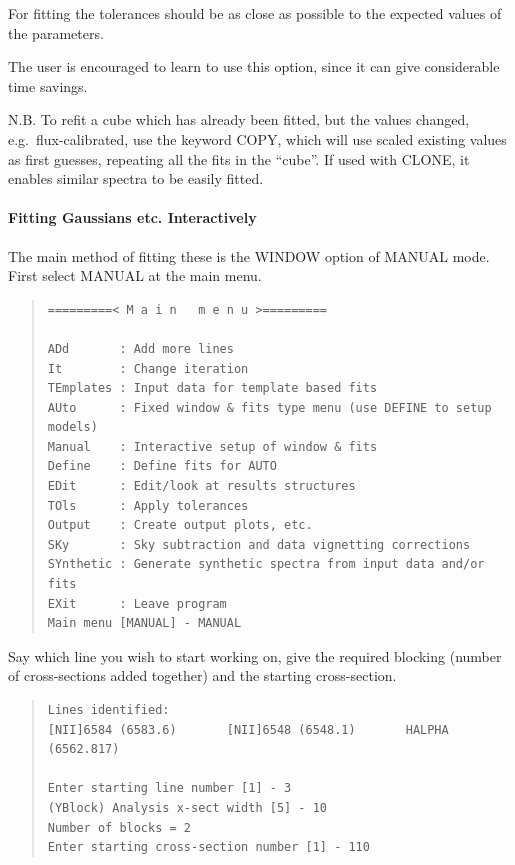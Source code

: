 For fitting the tolerances should be as close as possible to the
expected values of the parameters.

The user is encouraged to learn to use this option, since
it can give considerable time savings.

N.B. To refit a cube which has already been fitted, but the values
changed, e.g.\ flux-calibrated, use the keyword COPY, which will use
scaled existing values as first guesses, repeating all the fits in the
``cube''.
If used with CLONE, it enables similar spectra to be easily fitted. 


\paragraph{Fitting Gaussians etc. Interactively}

The main method of fitting these is the WINDOW option of MANUAL mode.
First select MANUAL at the main menu.
 
\begin{quote}\begin{verbatim}
=========< M a i n   m e n u >=========
 
ADd       : Add more lines
It        : Change iteration
TEmplates : Input data for template based fits
AUto      : Fixed window & fits type menu (use DEFINE to setup models)
Manual    : Interactive setup of window & fits
Define    : Define fits for AUTO
EDit      : Edit/look at results structures
TOls      : Apply tolerances
Output    : Create output plots, etc.
SKy       : Sky subtraction and data vignetting corrections
SYnthetic : Generate synthetic spectra from input data and/or fits
EXit      : Leave program
Main menu [MANUAL] - MANUAL
\end{verbatim}\end{quote}

Say which line you wish to start working on, give the required blocking
(number of cross-sections added together) and the starting
cross-section.

\begin{quote}\begin{verbatim} 
Lines identified:  
[NII]6584 (6583.6)       [NII]6548 (6548.1)       HALPHA (6562.817)

Enter starting line number [1] - 3 
(YBlock) Analysis x-sect width [5] - 10 
Number of blocks = 2 
Enter starting cross-section number [1] - 110
\end{verbatim}\end{quote} 

